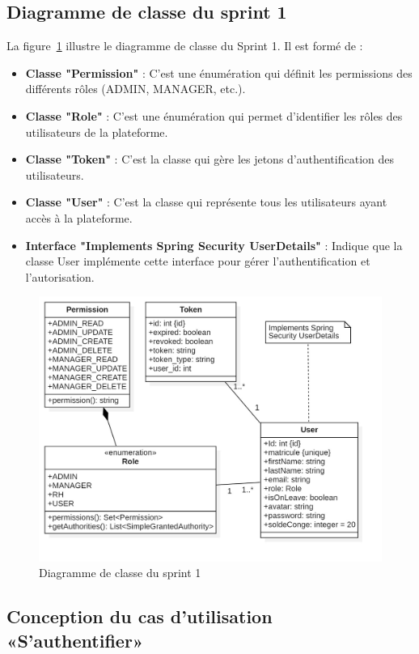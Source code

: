 \subsection{Diagramme de classe du sprint 1}
La figure~\ref{fig:class_diagram_sprint1} illustre le diagramme de classe du Sprint 1. Il est formé de :
\begin{itemize}
    \item \textbf{Classe "Permission"} : C’est une énumération qui définit les permissions des différents rôles (ADMIN, MANAGER, etc.).
    \item \textbf{Classe "Role"} : C’est une énumération qui permet d’identifier les rôles des utilisateurs de la plateforme.
    \item \textbf{Classe "Token"} : C’est la classe qui gère les jetons d’authentification des utilisateurs.
    \item \textbf{Classe "User"} : C’est la classe qui représente tous les utilisateurs ayant accès à la plateforme.
    \item \textbf{Interface "Implements Spring Security UserDetails"} : Indique que la classe User implémente cette interface pour gérer l’authentification et l’autorisation.
\end{itemize}
\begin{figure}[h]
     \centering
     \includegraphics[width=12cm]{images/ClassDiagUs.jpg}
     \caption{Diagramme de classe du sprint 1}
     \label{fig:class_diagram_sprint1}
 \end{figure}
 \newpage
 \subsection{Conception du cas d'utilisation «S'authentifier»}
